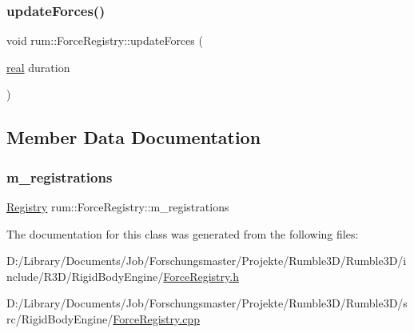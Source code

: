\mbox{\label{classrum_1_1_force_registry_a5fe035c304a9f490332c3e7db423dfaa}} 
\subsubsection{\texorpdfstring{update\+Forces()}{updateForces()}}
{\footnotesize\ttfamily void rum\+::\+Force\+Registry\+::update\+Forces (\begin{DoxyParamCaption}\item[{\mbox{\hyperlink{namespacerum_a7e8cca23573d5eaead0f138cbaa4862c}{real}}}]{duration }\end{DoxyParamCaption})}



\subsection{Member Data Documentation}
\mbox{\label{classrum_1_1_force_registry_ab1f714dc80759abe5e34761d79b7ab8f}} 
\subsubsection{\texorpdfstring{m\+\_\+registrations}{m\_registrations}}
{\footnotesize\ttfamily \mbox{\hyperlink{classrum_1_1_force_registry_a4a52c8f9558a80eea2e47e328b687c77}{Registry}} rum\+::\+Force\+Registry\+::m\+\_\+registrations\hspace{0.3cm}{\ttfamily [protected]}}



The documentation for this class was generated from the following files\+:\begin{DoxyCompactItemize}
\item 
D\+:/\+Library/\+Documents/\+Job/\+Forschungsmaster/\+Projekte/\+Rumble3\+D/\+Rumble3\+D/include/\+R3\+D/\+Rigid\+Body\+Engine/\mbox{\hyperlink{_force_registry_8h}{Force\+Registry.\+h}}\item 
D\+:/\+Library/\+Documents/\+Job/\+Forschungsmaster/\+Projekte/\+Rumble3\+D/\+Rumble3\+D/src/\+Rigid\+Body\+Engine/\mbox{\hyperlink{_force_registry_8cpp}{Force\+Registry.\+cpp}}\end{DoxyCompactItemize}
